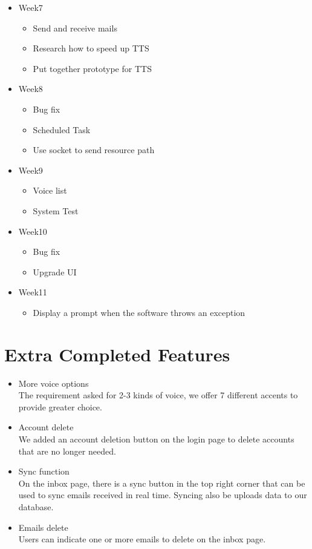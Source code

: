 \documentclass{article}
\begin{document}
\begin{itemize}
\begin{itemize}
    \end{itemize}
    \item Week7
    \begin{itemize}
        \item Send and receive mails
        \item Research how to speed up TTS
        \item Put together prototype for TTS
    \end{itemize}
    \item Week8
    \begin{itemize}
        \item Bug fix
        \item Scheduled Task
        \item Use socket to send resource path
    \end{itemize}
    \item Week9
    \begin{itemize}
        \item Voice list 
        \item System Test
    \end{itemize}
    \item Week10
    \begin{itemize}
        \item Bug fix 
        \item Upgrade UI
    \end{itemize}
    \item Week11
    \begin{itemize}
        \item Display a prompt when the software throws an exception
    \end{itemize}
\end{itemize}

\section{Extra Completed Features}
\begin{itemize}
    \item More voice options \\ 
    The requirement asked for 2-3 kinds of voice, we offer 7 different accents to provide greater choice.
    \item Account delete \\ 
    We added an account deletion button on the login page to delete accounts that are no longer needed.
    \item Sync function \\ 
    On the inbox page, there is a sync button in the top right corner that can be used to sync emails received in real time. Syncing also be uploads data to our database.
    \item Emails delete \\ 
    Users can indicate one or more emails to delete on the inbox page.
\end{itemize}
\end{document}
